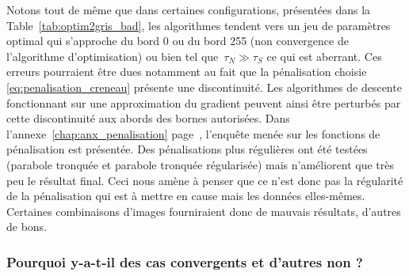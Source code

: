 \documentclass[main.tex]{subfiles}
\begin{document}
Notons tout de même que dans certaines configurations, présentées dans la Table~\ref{tab:optim2gris_bad}, les algorithmes tendent vers un jeu de paramètres optimal qui s'approche du bord 0 ou du bord 255 %
(\ie non convergence de l'algorithme d'optimisation) %
ou bien tel que~$\tau_N{\gg}\tau_S$ ce qui est aberrant. 
Ces erreurs pourraient être dues notamment au fait que la pénalisation choisie \eqref{eq:penalisation_creneau} présente une discontinuité. 
Les algorithmes de descente fonctionnant sur une approximation du gradient peuvent ainsi être perturbés par cette discontinuité aux abords des bornes autorisées. Dans l'annexe~\ref{chap:anx_penalisation} page~\pageref{chap:anx_penalisation}, l'enquête menée sur les fonctions de pénalisation est présentée. 
Des pénalisations plus régulières ont été testées (parabole tronquée et parabole tronquée régularisée) mais n'améliorent que très peu le résultat final. Ceci nous amène à penser que ce n'est donc pas la régularité de la pénalisation qui est à mettre en cause mais les données elles-mêmes. Certaines combinaisons d'images fourniraient donc de mauvais résultats, d'autres de bons.  


\subsubsection*{Pourquoi y-a-t-il des cas convergents et d'autres non ?\label{subsec:pb_condi}}



\end{document}

